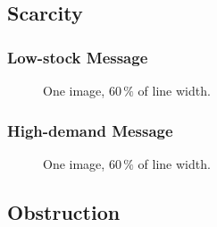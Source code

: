     \subsection*{Scarcity}
    \blind[1]
        \subsubsection*{Low-stock Message}
        \blind[1]
        \begin{figure}
            \centering
            \caption{One image, $60\,\%$ of line width.  
              }
            \label{fig:TODO}
        \end{figure}
        \subsubsection*{High-demand Message}
        \blind[1]
        \begin{figure}
            \centering
            \caption{One image, $60\,\%$ of line width.  
              }
            \label{fig:TODO}
        \end{figure}
    \subsection*{Obstruction}
    \blind[1]
